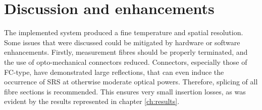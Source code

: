 \documentclass{standalone}
\begin{document}
\chapter{Discussion and enhancements} \label{ch:discussion}
\setcounter{page}\thestranica


The implemented system produced a fine temperature and spatial resolution. Some issues that were discussed could be mitigated by hardware or software enhancements. Firstly, measurement fibres should be properly terminated, and the use of opto-mechanical connectors reduced. Connectors, especially those of FC-type, have demonstrated large reflections, that can even induce the occurrence of SRS at otherwise moderate optical powers. Therefore, splicing of all fibre sections is recommended. This ensures very small insertion losses, as was evident by the results represented in chapter \ref{ch:results}. \\
\end{document}
